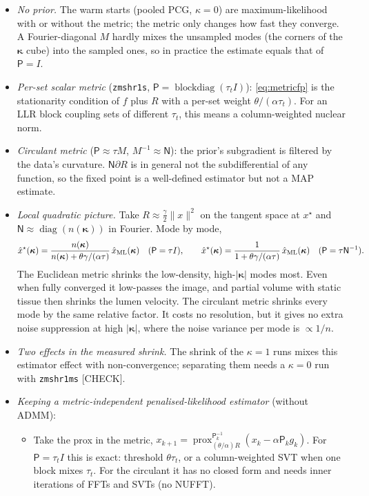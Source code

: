 \documentclass[11pt]{article}
\theoremstyle{remark}
\newcommand{\Nop}{\mathsf N}
\newcommand{\diag}{\operatorname{diag}}
\begin{document}
\begin{itemize}
  \item \emph{No prior.} The warm starts (pooled PCG, $\kappa=0$) are maximum-likelihood with or without the metric; the metric only changes how fast they converge. A Fourier-diagonal $M$ hardly mixes the unsampled modes (the corners of the $\bm\kappa$ cube) into the sampled ones, so in practice the estimate equals that of $\mathsf P=I$.
  \item \emph{Per-set scalar metric} (\texttt{zmshr1s}, $\mathsf P=\operatorname{blockdiag}(\tau_tI)$): \eqref{eq:metricfp} is the stationarity condition of $f$ plus $R$ with a per-set weight $\theta/(\alpha\tau_t)$. For an LLR block coupling sets of different $\tau_t$, this means a column-weighted nuclear norm.
  \item \emph{Circulant metric} ($\mathsf P\approx\tau M$, $M^{-1}\approx\Nop$): the prior's subgradient is filtered by the data's curvature. $\Nop\partial R$ is in general not the subdifferential of any function, so the fixed point is a well-defined estimator but not a MAP estimate.
  \item \emph{Local quadratic picture.} Take $R\approx\frac\gamma2\|x\|^2$ on the tangent space at $x^\star$ and $\Nop\approx\diag(n(\bm\kappa))$ in Fourier. Mode by mode,
  \[
    \hat x^\star(\bm\kappa)=\frac{n(\bm\kappa)}{n(\bm\kappa)+\theta\gamma/(\alpha\tau)}\,\hat x_{\rm ML}(\bm\kappa)\quad(\mathsf P=\tau I),\qquad
    \hat x^\star(\bm\kappa)=\frac1{1+\theta\gamma/(\alpha\tau)}\,\hat x_{\rm ML}(\bm\kappa)\quad(\mathsf P=\tau\Nop^{-1}).
  \]
  The Euclidean metric shrinks the low-density, high-$|\bm\kappa|$ modes most. Even when fully converged it low-passes the image, and partial volume with static tissue then shrinks the lumen velocity.
  The circulant metric shrinks every mode by the same relative factor. It costs no resolution, but it gives no extra noise suppression at high $|\bm\kappa|$, where the noise variance per mode is $\propto1/n$.
  \item \emph{Two effects in the measured shrink.} The shrink of the $\kappa=1$ runs mixes this estimator effect with non-convergence; separating them needs a $\kappa=0$ run with \texttt{zmshr1ms} [CHECK].
  \item \emph{Keeping a metric-independent penalised-likelihood estimator} (without ADMM):
  \begin{itemize}
    \item[(a)] Take the prox in the metric, $x_{k+1}=\operatorname{prox}^{\mathsf P_k^{-1}}_{(\theta/\alpha)R}(x_k-\alpha\mathsf P_kg_k)$. For $\mathsf P=\tau_tI$ this is exact: threshold $\theta\tau_t$, or a column-weighted SVT when one block mixes $\tau_t$. For the circulant it has no closed form and needs inner iterations of FFTs and SVTs (no NUFFT).

\end{itemize}
\end{itemize}
\end{document}
